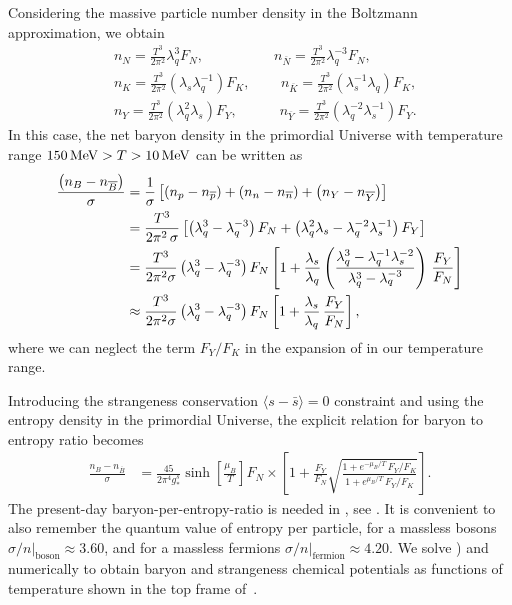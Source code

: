 Considering the massive particle number density in the Boltzmann approximation, we obtain
\begin{align}
\label{Density_N}
&n_N=\frac{T^3}{2\pi^2}\lambda_q^3F_N,\quad\qquad\qquad n_{\overline N}=\frac{T^3}{2\pi^2}\lambda^{-3}_qF_N,\\
\label{Density_K}
&n_K=\frac{T^3}{2\pi^2}\left(\lambda_s\lambda_q^{-1}\right)F_K,\,\qquad n_{\overline{K}}=\frac{T^3}{2\pi^2}\left(\lambda_s^{-1}\lambda_q\right)F_K,\\
\label{Density_Y}
&n_Y=\frac{T^3}{2\pi^2}\left(\lambda_q^2\lambda_s\right)F_Y,\quad\qquad n_{\overline Y}=\frac{T^3}{2\pi^2}\left(\lambda^{-2}_q\lambda_s^{-1}\right)F_Y.
\end{align}
In this case, the net baryon density in the primordial Universe with temperature range $150\text{\,MeV}> T>10\text{\,MeV}$ can be written as 
\begin{align}
\frac{\left(n_B-n_{\overline{B}}\right)}{\sigma}&=\frac{1}{\sigma}\left[\left(n_p-n_{\overline{p}}\right)+\left(n_n-n_{\overline{n}}\right)+\left(n_Y-n_{\overline{Y}}\right)\right]\notag\\
&=\frac{T^3}{2\pi^2\,\sigma}\left[\left(\lambda_q^3-\lambda^{-3}_q\right)F_N+\left(\lambda_q^2\lambda_s-\lambda^{-2}_q\lambda_s^{-1}\right)F_Y\right]\notag\\
&=\frac{T^3}{2\pi^2\sigma}\left(\lambda_q^3-\lambda_q^{-3}\right)F_N\left[1+\frac{\lambda_s}{\lambda_q}\left(\frac{\lambda_q^3-\lambda^{-1}_q\lambda_s^{-2}}{\lambda^3_q-\lambda^{-3}_q}\right)\,\frac{F_Y}{F_N}\right]\notag\\
&\approx\frac{T^3}{2\pi^2\sigma}\left(\lambda_q^3-\lambda_q^{-3}\right)F_N\left[1+\frac{\lambda_s}{\lambda_q}\,\frac{F_Y}{F_N}\right],
\end{align}
where we can neglect the term $F_Y/F_K$ in the expansion of  in our temperature range. 

Introducing the strangeness conservation $\langle s-\bar s\rangle=0$ constraint and using the entropy density in the primordial Universe, the explicit relation for baryon to entropy ratio becomes
\begin{align}\label{muBeq}
\frac{n_B-n_{\overline{B}}}{\sigma}&=\frac{45}{2\pi^4g^s_\ast}\sinh\left[\frac{\mu_B}{T}\right]F_N\times\left[1+\frac{F_Y}{F_N}\sqrt{\frac{1+e^{-\mu_B/T}\,F_Y/F_K}{1+e^{\mu_B/T}\,F_Y/F_K}}\right].
\end{align}
The present-day baryon-per-entropy-ratio is needed in , see . It is convenient to also remember the quantum value of entropy per particle, for a massless bosons $\sigma/n|_\mathrm{boson}\approx 3.60$, and for a massless fermions $\sigma/n|_\mathrm{fermion}\approx 4.20$. We solve ) and  numerically to obtain baryon and strangeness chemical potentials as functions of temperature shown in the top frame of~.

